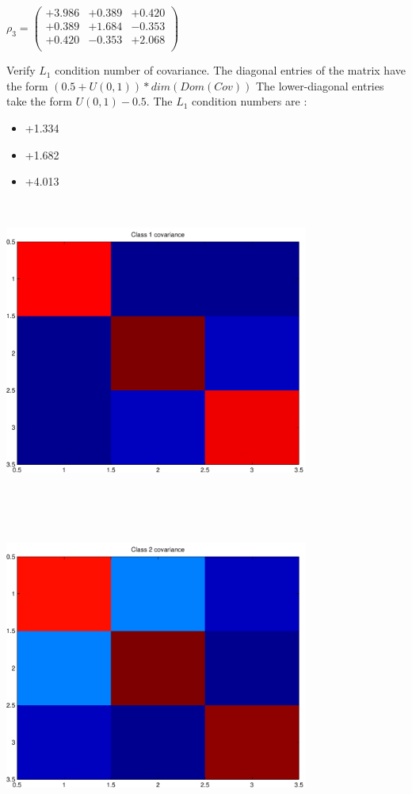 \documentclass[9pt]{article}
\theoremstyle{plain}
\theoremstyle{definition}
\theoremstyle{remark}
\numberwithin{equation}{section}
\begin{document}
$\rho_3 = \left(
\begin{array}{
ccc}
+3.986 & +0.389 & +0.420 \\
+0.389 & +1.684 & -0.353 \\
+0.420 & -0.353 & +2.068 \\
\end{array}
\right)$ \newline 

Verify $L_1$ condition number of covariance. The diagonal entries of the matrix have the form $(0.5 + U(0,1) )*dim(Dom(Cov))$
The lower-diagonal entries take the form $U(0,1) - 0.5$. 
The $L_1$ condition numbers are :
\begin{itemize}
\item +1.334
\item +1.682
\item +4.013
\end{itemize}
\includegraphics[width=10.0cm,height=10.0cm]{rv1_corr.pdf}

\includegraphics[width=10.0cm,height=10.0cm]{rv2_corr.pdf}
\end{document}

